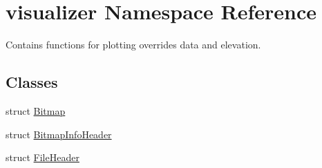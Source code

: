 \hypertarget{namespacevisualizer}{}\section{visualizer Namespace Reference}
\label{namespacevisualizer}


Contains functions for plotting overrides data and elevation.  


\subsection*{Classes}
\begin{DoxyCompactItemize}
\item 
struct \mbox{\hyperlink{structvisualizer_1_1_bitmap}{Bitmap}}
\item 
struct \mbox{\hyperlink{structvisualizer_1_1_bitmap_info_header}{Bitmap\+Info\+Header}}
\item 
struct \mbox{\hyperlink{structvisualizer_1_1_file_header}{File\+Header}}
\end{DoxyCompactItemize}
